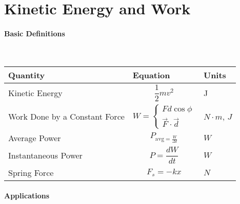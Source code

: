 \documentclass{article}
\begin{document}
\section{Kinetic Energy and Work}
\paragraph{Basic Definitions}\

\begin{tabularx}{\textwidth}{l | X | l}
Quantity & Equation & Units \\
\hline \hline
 \hline
Kinetic Energy & \begin{equation*}
\frac{1}{2}mv^2   
\end{equation*}

 & J \\
 \hline
Work Done by a Constant Force & $$
W =\begin{cases}
			Fd \cos\phi\\
            \vec{F}^{} \cdot \vec{d}^{}
		 \end{cases}$$ & $N \cdot m$, $J$ \\ 
 \hline
 Average Power & \begin{equation*} P_{\mathrm{avg} = \frac{W}{\Delta t}}\end{equation*} & $W$\\
 \hline
 Instantaneous Power & \begin{equation*}
     P = \frac{dW}{dt}
 \end{equation*} & $W$ \\
 \hline
 Spring Force & \begin{equation*}
     F_s = -kx
 \end{equation*} & $N$ \\
 \hline
\end{tabularx}


\paragraph{Applications}\
\end{document}
